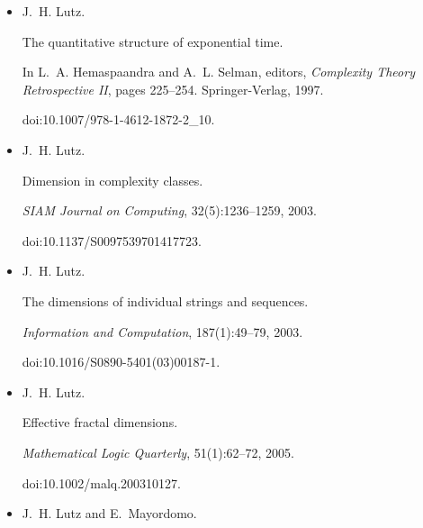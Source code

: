 \begin{itemize}
J. H. Lutz.


Almost everywhere high nonuniform complexity.


\emph{Journal of Computer and System Sciences}, 44(2):220–258, 1992.


doi:10.1016/0022-0000(92)90020-j.





\item[] 
[51]

J. H. Lutz.


The quantitative structure of exponential time.


In L. A. Hemaspaandra and A. L. Selman, editors, \emph{Complexity
Theory Retrospective II}, pages 225–254. Springer-Verlag, 1997.


doi:10.1007/978-1-4612-1872-2\_10.





\item[] 
[52]

J. H. Lutz.


Dimension in complexity classes.


\emph{SIAM Journal on Computing}, 32(5):1236–1259, 2003.


doi:10.1137/S0097539701417723.





\item[] 
[53]

J. H. Lutz.


The dimensions of individual strings and sequences.


\emph{Information and Computation}, 187(1):49–79, 2003.


doi:10.1016/S0890-5401(03)00187-1.





\item[] 
[54]

J. H. Lutz.


Effective fractal dimensions.


\emph{Mathematical Logic Quarterly}, 51(1):62–72, 2005.


doi:10.1002/malq.200310127.





\item[] 
[55]

J. H. Lutz and E. Mayordomo.



\end{itemize}
